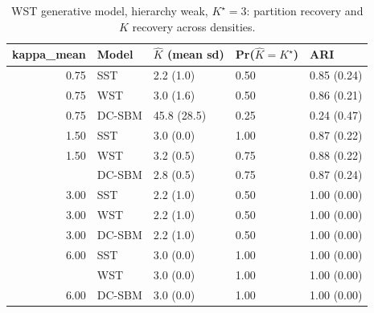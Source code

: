 \begin{table}
\centering
\caption{WST generative model, hierarchy weak, $K^\star=3$: partition recovery and $K$ recovery across densities.}
\centering
\begin{tabular}[t]{rllll}
\toprule
kappa_mean & Model & $\hat K$ (mean sd) & Pr($\hat K = K^\star$) & ARI\\
\midrule
0.75 & SST & 2.2 (1.0) & 0.50 & 0.85 (0.24)\\
0.75 & WST & 3.0 (1.6) & 0.50 & 0.86 (0.21)\\
0.75 & DC-SBM & 45.8 (28.5) & 0.25 & 0.24 (0.47)\\
1.50 & SST & 3.0 (0.0) & 1.00 & 0.87 (0.22)\\
1.50 & WST & 3.2 (0.5) & 0.75 & 0.88 (0.22)\\
\addlinespace
1.50 & DC-SBM & 2.8 (0.5) & 0.75 & 0.87 (0.24)\\
3.00 & SST & 2.2 (1.0) & 0.50 & 1.00 (0.00)\\
3.00 & WST & 2.2 (1.0) & 0.50 & 1.00 (0.00)\\
3.00 & DC-SBM & 2.2 (1.0) & 0.50 & 1.00 (0.00)\\
6.00 & SST & 3.0 (0.0) & 1.00 & 1.00 (0.00)\\
\addlinespace
6.00 & WST & 3.0 (0.0) & 1.00 & 1.00 (0.00)\\
6.00 & DC-SBM & 3.0 (0.0) & 1.00 & 1.00 (0.00)\\
\bottomrule
\end{tabular}
\end{table}
